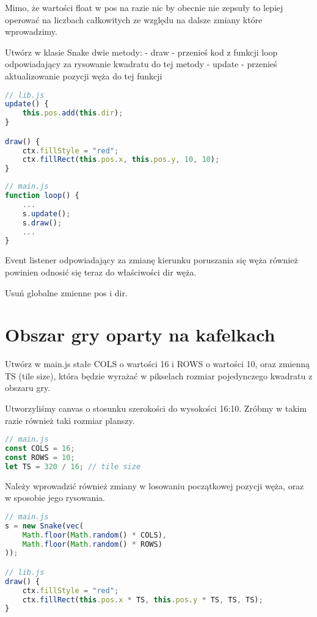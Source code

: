 \documentclass[12pt]{article}
\begin{document}
Mimo, że wartości float w pos na razie nic by obecnie nie zepsuły to lepiej operować na liczbach całkowitych ze względu na dalsze zmiany które wprowadzimy.

Utwórz w klasie Snake dwie metody:
- draw - przenieś kod z funkcji loop odpowiadający za rysowanie kwadratu do tej metody
- update - przenieś aktualizowanie pozycji węża do tej funkcji

\begin{lstlisting}[language=JavaScript]
// lib.js
update() {
    this.pos.add(this.dir);
}

draw() {
    ctx.fillStyle = "red";
    ctx.fillRect(this.pos.x, this.pos.y, 10, 10);
}
\end{lstlisting}


\begin{lstlisting}[language=JavaScript]
// main.js
function loop() {    
    ...
    s.update();
    s.draw();
    ...
}
\end{lstlisting}

Event listener odpowiadający za zmianę kierunku poruszania się węża również powinien odnosić się teraz do właściwości dir węża.

Usuń globalne zmienne pos i dir.

\section{Obszar gry oparty na kafelkach}
Utwórz w main.js stałe COLS o wartości 16 i ROWS o wartości 10, oraz  zmienną TS (tile size), która będzie wyrażać w pikselach rozmiar pojedynczego kwadratu z obszaru gry.

Utworzyliśmy canvas o stosunku szerokości do wysokości 16:10. Zróbmy w takim razie również taki rozmiar planszy.
\begin{lstlisting}[language=JavaScript]
// main.js
const COLS = 16;
const ROWS = 10;
let TS = 320 / 16; // tile size
\end{lstlisting}

Należy wprowadzić również zmiany w losowaniu początkowej pozycji węża, oraz w sposobie jego rysowania.
\begin{lstlisting}[language=JavaScript]
// main.js
s = new Snake(vec(
    Math.floor(Math.random() * COLS),
    Math.floor(Math.random() * ROWS)
));

// lib.js
draw() {
    ctx.fillStyle = "red";
    ctx.fillRect(this.pos.x * TS, this.pos.y * TS, TS, TS);
}
\end{lstlisting}
\end{document}
